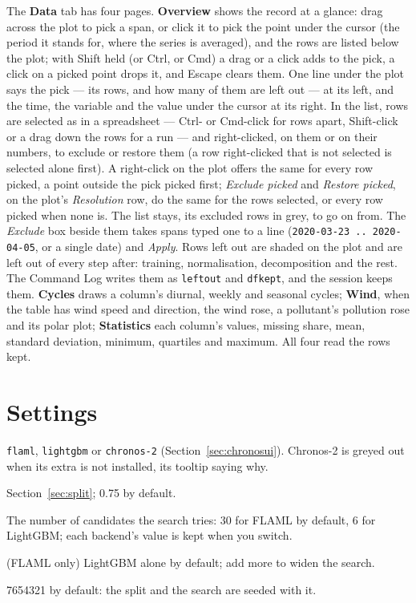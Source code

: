 \documentclass[11pt]{report}
\newcommand{\nosep}{\setlength{\itemsep}{0pt}\setlength{\parskip}{0pt}\setlength{\topsep}{2pt}}
\newcommand{\codeunderscore}{\textunderscore\allowbreak}
\newcommand{\code}[1]{\texttt{\let\_\codeunderscore #1}}
\newcommand{\tab}[1]{\textbf{#1}}
\begin{document}
The \tab{Data} tab has four pages. \tab{Overview} shows the record at a glance: drag across
the plot to pick a span, or click it to pick the point under the cursor (the period it
stands for, where the series is averaged), and the rows are listed below the plot; with
Shift held (or Ctrl, or Cmd) a drag or a click adds to the pick, a click on a picked point
drops it, and Escape clears them. One line under the plot says the pick --- its rows,
and how many of them are left out --- at its left, and the time, the variable and the
value under the cursor at its right. In the list, rows are selected
as in a spreadsheet --- Ctrl- or Cmd-click for rows apart, Shift-click or a drag down the
rows for a run --- and right-clicked, on them or on their numbers, to exclude or restore
them (a row right-clicked that is not selected is selected alone first). A right-click on
the plot offers the same for every row picked, a point outside the pick picked first;
\emph{Exclude picked}
and \emph{Restore picked}, on the plot's \emph{Resolution} row, do the same for the rows
selected, or every row picked when none is. The list stays, its excluded rows in grey, to
go on from. The \emph{Exclude} box beside them takes spans typed one to a line
(\code{2020-03-23 .. 2020-04-05}, or a single date) and \emph{Apply}. Rows left out
are shaded on the plot and are left out of every step after: training, normalisation,
decomposition and the rest. The Command Log writes them as \code{left\_out} and
\code{df\_kept}, and the session keeps them. \tab{Cycles} draws a column's diurnal, weekly and
seasonal cycles; \tab{Wind}, when the table has wind speed and direction, the wind rose,
a pollutant's pollution rose and its polar plot; \tab{Statistics} each column's values,
missing share, mean, standard deviation, minimum, quartiles and maximum. All four read
the rows kept.

\section{Settings}
\begin{description}\nosep
  \item[Backend] \code{flaml}, \code{lightgbm} or \code{chronos-2}
        (Section~\ref{sec:chronosui}). Chronos-2 is greyed out when its extra is not
        installed, its tooltip saying why.
  \item[Split method, Training fraction] Section~\ref{sec:split}; 0.75 by default.
  \item[Search trials] The number of candidates the search tries: 30 for FLAML by
        default, 6 for LightGBM; each backend's value is kept when you switch.
  \item[Estimators] (FLAML only) LightGBM alone by default; add more to widen the search.
  \item[Seed] 7654321 by default: the split and the search are seeded with it.
\end{description}
\end{document}
